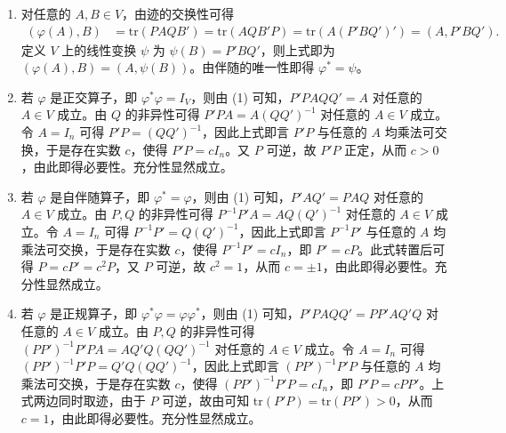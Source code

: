 \documentclass[../../main.tex]{subfiles}%
\begin{document}
\begin{solution}
\begin{enumerate}[(1)]
\item 对任意的 \(A,B\in V\)，由迹的交换性可得
\begin{align*}
(\varphi(A),B)&=\mathrm{tr}(PAQB')=\mathrm{tr}(AQB'P)=\mathrm{tr}(A(P'BQ')')=(A,P'BQ').
\end{align*}
定义 \(V\) 上的线性变换 \(\psi\) 为 \(\psi(B)=P'BQ'\)，则上式即为 \((\varphi(A),B)=(A,\psi(B))\)。由伴随的唯一性即得 \(\varphi^* = \psi\)。
\item 若 \(\varphi\) 是正交算子，即 \(\varphi^*\varphi = I_V\)，则由 (1) 可知，\(P'PAQQ' = A\) 对任意的 \(A\in V\) 成立。由 \(Q\) 的非异性可得 \(P'PA = A(QQ')^{-1}\) 对任意的 \(A\in V\) 成立。令 \(A = I_n\) 可得 \(P'P=(QQ')^{-1}\)，因此上式即言 \(P'P\) 与任意的 \(A\) 均乘法可交换，于是存在实数 \(c\)，使得 \(P'P = cI_n\)。又 \(P\) 可逆，故 \(P'P\) 正定，从而 \(c > 0\)，由此即得必要性。充分性显然成立。
\item 若 \(\varphi\) 是自伴随算子，即 \(\varphi^* = \varphi\)，则由 (1) 可知，\(P'AQ' = PAQ\) 对任意的 \(A\in V\) 成立。由 \(P,Q\) 的非异性可得 \(P^{-1}P'A = AQ(Q')^{-1}\) 对任意的 \(A\in V\) 成立。令 \(A = I_n\) 可得 \(P^{-1}P' = Q(Q')^{-1}\)，因此上式即言 \(P^{-1}P'\) 与任意的 \(A\) 均乘法可交换，于是存在实数 \(c\)，使得 \(P^{-1}P' = cI_n\)，即 \(P' = cP\)。此式转置后可得 \(P = cP' = c^2P\)，又 \(P\) 可逆，故 \(c^2 = 1\)，从而 \(c = \pm1\)，由此即得必要性。充分性显然成立。 
\item 若 \(\varphi\) 是正规算子，即 \(\varphi^*\varphi = \varphi\varphi^*\)，则由 (1) 可知，\(P'PAQQ' = PP'AQ'Q\) 对任意的 \(A\in V\) 成立。由 \(P,Q\) 的非异性可得 \((PP')^{-1}P'PA = AQ'Q(QQ')^{-1}\) 对任意的 \(A\in V\) 成立。令 \(A = I_n\) 可得 \((PP')^{-1}P'P = Q'Q(QQ')^{-1}\)，因此上式即言 \((PP')^{-1}P'P\) 与任意的 \(A\) 均乘法可交换，于是存在实数 \(c\)，使得 \((PP')^{-1}P'P = cI_n\)，即 \(P'P = cPP'\)。上式两边同时取迹，由于 \(P\) 可逆，故由可知 \(\mathrm{tr}(P'P)=\mathrm{tr}(PP') > 0\)，从而 \(c = 1\)，由此即得必要性。充分性显然成立。 
\end{enumerate} 

\end{solution}
\end{document}
